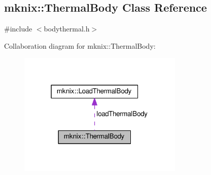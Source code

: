 \hypertarget{classmknix_1_1_thermal_body}{}\subsection{mknix\+:\+:Thermal\+Body Class Reference}
\label{classmknix_1_1_thermal_body}


{\ttfamily \#include $<$bodythermal.\+h$>$}



Collaboration diagram for mknix\+:\+:Thermal\+Body\+:\nopagebreak
\begin{figure}[H]
\begin{center}
\leavevmode
\includegraphics[width=223pt]{d5/d1e/classmknix_1_1_thermal_body__coll__graph}
\end{center}
\end{figure}

